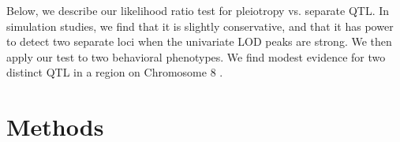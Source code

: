 \documentclass[12pt,twoside, lineno]{gsajnl}
\begin{document}
Below, we describe our likelihood ratio test for pleiotropy vs. separate QTL. In simulation studies, we find that it is slightly conservative, and that it has power to detect two separate loci when the univariate LOD peaks are strong. We then apply our test to two behavioral phenotypes. We find modest evidence for two distinct QTL in a region on Chromosome 8 \citep{logan2013high,recla2014precise}.






\section{Methods}
\label{sec:materials:methods}

\end{document}

